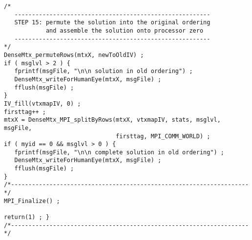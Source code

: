 \begin{verbatim}
/*
   --------------------------------------------------------
   STEP 15: permute the solution into the original ordering
            and assemble the solution onto processor zero
   --------------------------------------------------------
*/
DenseMtx_permuteRows(mtxX, newToOldIV) ;
if ( msglvl > 2 ) {
   fprintf(msgFile, "\n\n solution in old ordering") ;
   DenseMtx_writeForHumanEye(mtxX, msgFile) ;
   fflush(msgFile) ;
}
IV_fill(vtxmapIV, 0) ;
firsttag++ ;
mtxX = DenseMtx_MPI_splitByRows(mtxX, vtxmapIV, stats, msglvl, msgFile,
                                firsttag, MPI_COMM_WORLD) ;
if ( myid == 0 && msglvl > 0 ) {
   fprintf(msgFile, "\n\n complete solution in old ordering") ;
   DenseMtx_writeForHumanEye(mtxX, msgFile) ;
   fflush(msgFile) ;
}
/*--------------------------------------------------------------------*/
MPI_Finalize() ;

return(1) ; }
/*--------------------------------------------------------------------*/
\end{verbatim}
